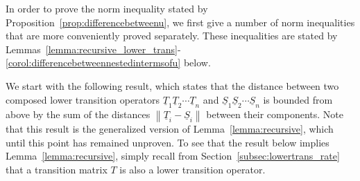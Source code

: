 \documentclass[10pt,a4paper]{paper}
\theoremstyle{definition}
\newtheorem{lemma}[theorem]{Lemma}
\newcommand{\lt}{\underline{T}}
\newcommand{\lrate}{\underline{Q}}
\newcommand{\norm}[1]{\left\lVert #1 \right\rVert}
\newcommand{\coloneqq}{:\!=}
\begin{document}

In order to prove the norm inequality stated by Proposition~\ref{prop:differencebetweenu}, we first give a number of norm inequalities that are more conveniently proved separately. These inequalities are stated by Lemmas~\ref{lemma:recursive_lower_trans}-\ref{corol:differencebetweennestedintermsofu} below.

We start with the following result, which states that the distance between two composed lower transition operators $\lt_1\lt_2\cdots\lt_n$ and $\underline{S}_1\underline{S}_2\cdots\underline{S}_n$ is bounded from above by the sum of the distances $\norm{\lt_i - \underline{S}_i}$ between their components. Note that this result is the generalized version of Lemma~\ref{lemma:recursive}, which until this point has remained unproven. To see that the result below implies Lemma~\ref{lemma:recursive}, simply recall from Section~\ref{subsec:lowertrans_rate} that a transition matrix $T$ is also a lower transition operator.
\end{document}
